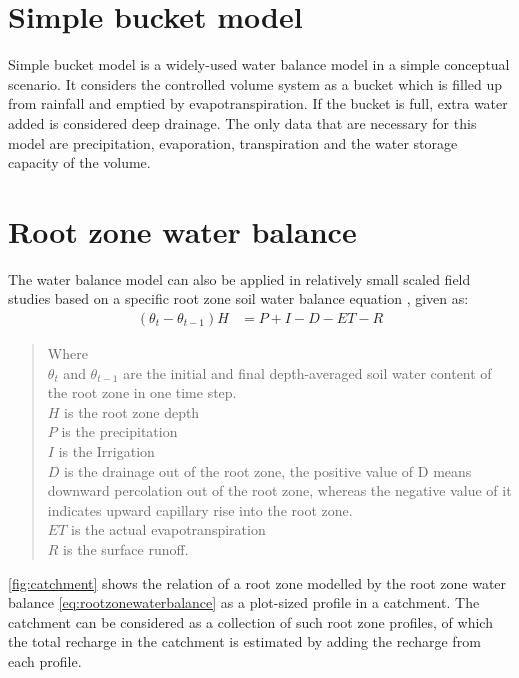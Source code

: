 \section{Simple bucket model}
Simple bucket model is a widely-used water balance model in a simple conceptual scenario. It considers the controlled volume system as a bucket which is filled up from rainfall and emptied by evapotranspiration. If the bucket is full, extra water added is considered deep drainage. The only data that are necessary for this model are precipitation, evaporation, transpiration and the water storage capacity of the volume. 
\section{Root zone water balance}
 The water balance model can also be applied in relatively small scaled field studies based on a specific root zone soil water balance equation \citep{Ma2013}, given as:
\begin{align}
(\theta_t - \theta_{t-1})H &= P+I-D-ET-R\label{eq:rootzonewaterbalance}
\end{align}
\begin{quote}
Where \\
$\theta_t$ and $\theta_{t-1}$ are the initial and final depth-averaged soil water content of the root zone in one time step. \\
$H$ is the root zone depth\\
$P$ is the precipitation\\
$I$ is the Irrigation\\
$D$ is the drainage out of the root zone, the positive value of D means downward percolation out of the root zone, whereas the negative value of it indicates upward capillary rise into the root zone.\\ $ET$ is the actual evapotranspiration\\
$R$ is the surface runoff. 
\end{quote}
\autoref{fig:catchment} shows the relation of a root zone modelled by the root zone water balance \autoref{eq:rootzonewaterbalance} as a plot-sized profile in a catchment. The catchment can be considered as a collection of such root zone profiles, of which the total recharge in the catchment is estimated by adding the recharge from each profile. 
